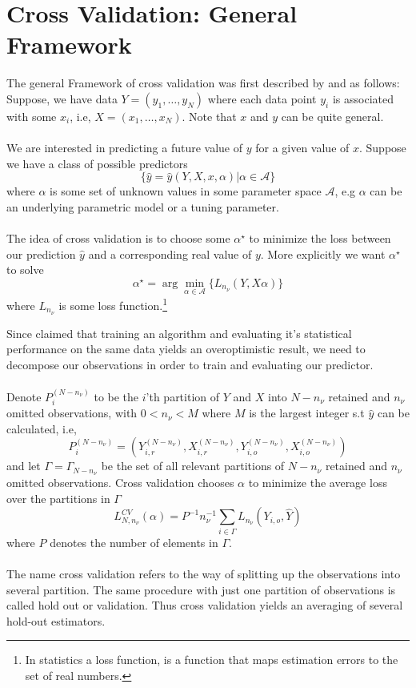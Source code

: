 \documentclass[Research_Module_ES.tex]{subfiles}
\begin{document}
\section{Cross Validation: General Framework}
The general Framework of cross validation was first described by \cite{stone1974cross} and  \cite{geisser1975predictive} as follows: \\

Suppose, we have data $Y=(y_1,\ldots,y_N)$ where each data point $y_i$ is associated with some $x_i$, i.e, $X=(x_1,\ldots,x_N)$. Note that $x$ and $y$ can be quite general.\\
\\
We are interested in predicting a future value of $y$ for a given value of $x$. Suppose we have a class of possible predictors 
\[
	\{\hat{y}=\hat{y}(Y,X,x,\alpha)|\alpha\in\mathscr{A}\}
\]
where $\alpha$ is some set of unknown values in some parameter space $\mathscr{A}$, e.g $\alpha$ can be an underlying parametric model or a tuning parameter.\\
\\
The idea of cross validation is to choose some $\alpha^\star$ to minimize the loss between our prediction $\hat{y}$ and a corresponding real value of $y$. More explicitly we want $\alpha^\star$ to solve
\[
	\alpha^\star=\arg\min_{\alpha\in\mathscr{A}}\{L_{n_\nu}(Y,X\alpha)\}
\]
where $L_{n_\nu}$ is some loss function.\footnote{In statistics a loss function, is a function that maps estimation errors to the set of real numbers.  }
 
Since \cite{larson1931shrinkage} claimed that training an algorithm and evaluating it's statistical performance on the same data yields an overoptimistic result, we need to decompose our observations in order to train and evaluating our predictor. \\
\\
Denote $P^{(N-n_\nu)}_i$ to be the $i$'th partition of $Y$ and $X$ into $N-n_\nu$ retained and $n_\nu$ omitted observations, with $0<n_\nu<M$ where $M$ is the largest integer s.t $\hat{y}$ can be calculated, i.e,
\[
	P^{(N-n_\nu)}_i=(Y_{i,r}^{(N-n_\nu)},X_{i,r}^{(N-n_\nu)},Y_{i,o}^{(N-n_\nu)},X_{i,o}^{(N-n_\nu)})
\]
and let $\Gamma=\Gamma_{N-n_\nu}$ be the set of all relevant partitions of $N-n_\nu$ retained and $n_\nu$ omitted observations. Cross validation chooses $\alpha$ to minimize the average loss over the partitions in $\Gamma$ 
\[
	L_{N,n_\nu}^{CV}(\alpha)=P^{-1}n_\nu^{-1}\sum_{i\in\Gamma}L_{n_\nu}(Y_{i,o},\hat{Y})
\]
where $P$ denotes the number of elements in $\Gamma$.\\
\\
The name cross validation refers to the way of splitting up the observations into several partition. The same procedure with just one partition of observations is called hold out or validation. Thus cross validation yields an averaging of several hold-out estimators.
\end{document}
